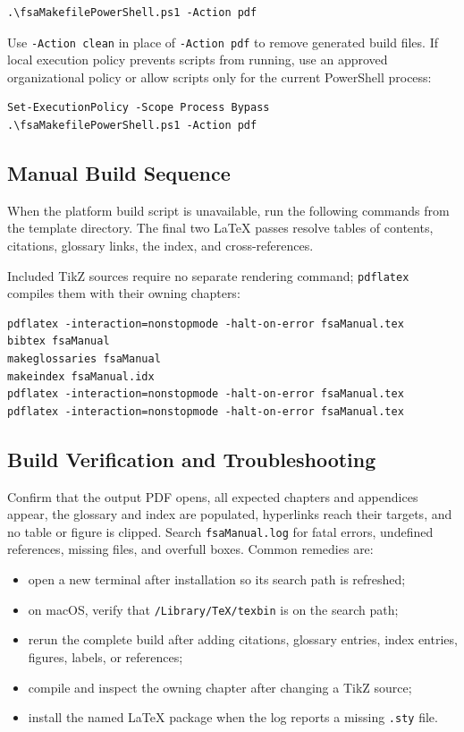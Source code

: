 \begin{verbatim}
.\fsaMakefilePowerShell.ps1 -Action pdf
\end{verbatim}

Use \texttt{-Action clean} in place of \texttt{-Action pdf} to remove generated build files. If local execution policy prevents scripts from running, use an approved organizational policy or allow scripts only for the current PowerShell process:

\begin{verbatim}
Set-ExecutionPolicy -Scope Process Bypass
.\fsaMakefilePowerShell.ps1 -Action pdf
\end{verbatim}

\subsection{Manual Build Sequence}

When the platform build script is unavailable, run the following commands from
the template directory. The final two LaTeX passes resolve tables of contents,
citations, glossary links, the index, and cross-references.

Included TikZ sources require no separate rendering command; \texttt{pdflatex}
compiles them with their owning chapters:

\begin{verbatim}
pdflatex -interaction=nonstopmode -halt-on-error fsaManual.tex
bibtex fsaManual
makeglossaries fsaManual
makeindex fsaManual.idx
pdflatex -interaction=nonstopmode -halt-on-error fsaManual.tex
pdflatex -interaction=nonstopmode -halt-on-error fsaManual.tex
\end{verbatim}

\subsection{Build Verification and Troubleshooting}

Confirm that the output PDF opens, all expected chapters and appendices appear,
the glossary and index are populated, hyperlinks reach their targets, and no
table or figure is clipped. Search \texttt{fsaManual.log} for fatal errors,
undefined references, missing files, and overfull boxes. Common remedies are:

\begin{itemize}
\item open a new terminal after installation so its search path is refreshed;
\item on macOS, verify that \texttt{/Library/TeX/texbin} is on the search path;
\item rerun the complete build after adding citations, glossary entries, index
entries, figures, labels, or references;
\item compile and inspect the owning chapter after changing a TikZ source;
\item install the named LaTeX package when the log reports a missing
\texttt{.sty} file.
\end{itemize}

